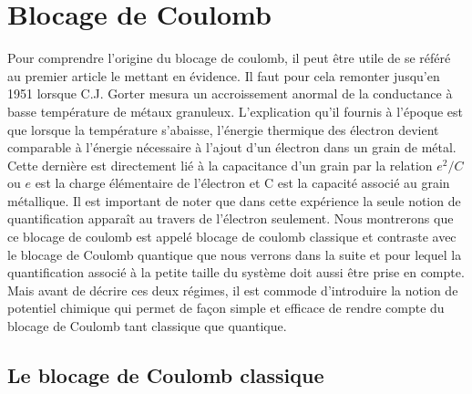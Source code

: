 

\chapter{Blocage de Coulomb}
Pour comprendre l'origine du blocage de coulomb, il peut être utile de se référé au premier article le mettant en évidence. Il faut pour cela remonter jusqu'en 1951 lorsque C.J. Gorter mesura un accroissement anormal de la conductance à basse température de métaux granuleux. L'explication qu'il fournis à l'époque est que lorsque la température s'abaisse, l'énergie thermique des électron devient comparable à l'énergie nécessaire à l'ajout d'un électron dans un grain de métal. Cette dernière est directement lié à la capacitance d'un grain par la relation $e^2/C$ ou $e$ est la charge élémentaire de l'électron et C est la capacité associé au grain métallique. Il est important de noter que dans cette expérience la seule notion de quantification apparaît au travers de l'électron seulement. Nous montrerons que ce blocage de coulomb est appelé blocage de coulomb classique et contraste avec le blocage de Coulomb quantique que nous verrons dans la suite et pour lequel la quantification associé à la petite taille du système doit aussi être prise en compte. Mais avant de décrire ces deux régimes, il est commode d'introduire la notion de potentiel chimique qui permet de façon simple et efficace de rendre compte du blocage de Coulomb tant classique que quantique.


\section{Le blocage de Coulomb classique}

